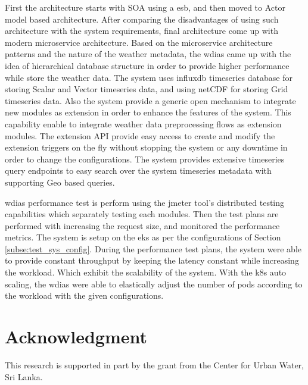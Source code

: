 \documentclass[conference]{IEEEtran}
\newcommand{\db}[1]{\textcolor{blue!40}{#1}}
\begin{document}
First the architecture starts with SOA using a \acrfull{esb}, and then moved to Actor model based architecture. After comparing the disadvantages of using such architecture with the system requirements, final architecture come up with modern microservice architecture.
Based on the microservice architecture patterns and the nature of the weather metadata, the \acrshort{wdias} came up with the idea of hierarchical database structure in order to provide higher performance while store the weather data. The system uses \acrshort{influxdb} timeseries database for storing Scalar and Vector timeseries data, and using \acrshort{netCDF} for storing Grid timeseries data.
Also the system provide a generic open mechanism to integrate new modules as extension in order to enhance the features of the system. This capability enable to integrate weather data preprocessing flows as extension modules.
The extension API provide easy access to create and modify the extension triggers on the fly without stopping the system or any downtime in order to change the configurations.
The system provides extensive timeseries query endpoints to easy search over the system timeseries metadata with supporting Geo based queries.

\acrshort{wdias} performance test is perform using the \acrshort{jmeter} tool's distributed testing capabilities which separately testing each modules. Then the test plans are performed with increasing the request size, and monitored the performance metrics. The system is setup on the \acrfull{eks} as per the configurations of Section \ref{subse:test_sys_config}.
During the performance test plans, the system were able to provide constant throughput by keeping the latency constant while increasing the workload. Which exhibit the scalability of the system.
With the \acrshort{k8s} auto scaling, the \acrshort{wdias} were able to elastically adjust the number of pods according to the workload with the given configurations.

\section*{Acknowledgment}
\db{This research is supported in part by the grant from the Center for Urban Water, Sri Lanka.}


\graphicspath{ {./images/} }

% 
% 
\printbibliography[title={References}]
\end{document}
